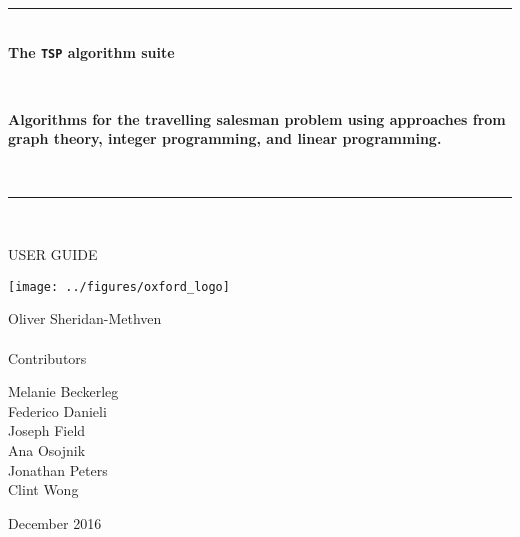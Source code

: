 \begin{center}
\begin{Huge}
\rule{\linewidth}{1pt} \\	
\textbf{
The \texttt{TSP} algorithm suite
} \\ 
\end{Huge}
\hfill \\
\begin{Large}
\textbf{Algorithms for the travelling salesman problem using approaches from graph theory, integer programming, and linear programming.}
\end{Large} \\
\rule{\linewidth}{1pt} \\
\vspace{1cm}
\begin{huge}
USER GUIDE \\
\end{huge}
\vspace{1cm}
\texttt{[image: ../figures/oxford\_logo]} \\
\vspace{1cm}
\begin{Large}
Oliver Sheridan-Methven \\
\hfill \\
Contributors
\begin{multicols}{2}
Melanie Beckerleg \\
Federico Danieli \\
Joseph Field \\
Ana Osojnik \\
Jonathan Peters \\
Clint Wong \\
\end{multicols}
\vspace{1cm}
December 2016
\end{Large}
\end{center}
\clearpage